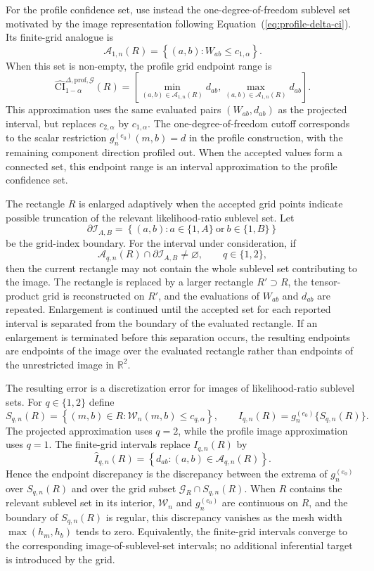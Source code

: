 \documentclass[11pt]{article}
\begin{document}
For the profile confidence set, use instead the one-degree-of-freedom sublevel set motivated by the image representation following Equation~(\ref{eq:profile-delta-ci}). Its finite-grid analogue is
\[
  \mathcal{A}_{1,n}(R)
  =
  \left\{
    (a,b):
    W_{ab}\leq c_{1,\alpha}
  \right\}.
\]
When this set is non-empty, the profile grid endpoint range is
\[
  \widehat{\mathrm{CI}}^{\Delta,\mathrm{prof},\mathcal{G}}_{1-\alpha}(R)
  =
  \left[
    \min_{(a,b)\in\mathcal{A}_{1,n}(R)} d_{ab},
    \max_{(a,b)\in\mathcal{A}_{1,n}(R)} d_{ab}
  \right].
\]
This approximation uses the same evaluated pairs $(W_{ab},d_{ab})$ as the projected interval, but replaces $c_{2,\alpha}$ by $c_{1,\alpha}$. The one-degree-of-freedom cutoff corresponds to the scalar restriction $g_n^{(e_0)}(m,b)=d$ in the profile construction, with the remaining component direction profiled out. When the accepted values form a connected set, this endpoint range is an interval approximation to the profile confidence set.

The rectangle $R$ is enlarged adaptively when the accepted grid points indicate possible truncation of the relevant likelihood-ratio sublevel set. Let
\[
  \partial\mathcal{I}_{A,B}
  =
  \left\{
    (a,b):
    a\in\{1,A\}\ \text{or}\ b\in\{1,B\}
  \right\}
\]
be the grid-index boundary. For the interval under consideration, if
\[
  \mathcal{A}_{q,n}(R)\cap\partial\mathcal{I}_{A,B}\neq\varnothing,
  \qquad q\in\{1,2\},
\]
then the current rectangle may not contain the whole sublevel set contributing to the image. The rectangle is replaced by a larger rectangle $R'\supset R$, the tensor-product grid is reconstructed on $R'$, and the evaluations of $W_{ab}$ and $d_{ab}$ are repeated. Enlargement is continued until the accepted set for each reported interval is separated from the boundary of the evaluated rectangle. If an enlargement is terminated before this separation occurs, the resulting endpoints are endpoints of the image over the evaluated rectangle rather than endpoints of the unrestricted image in $\mathbb{R}^2$.

The resulting error is a discretization error for images of likelihood-ratio sublevel sets. For $q\in\{1,2\}$ define
\[
  S_{q,n}(R)
  =
  \left\{
    (m,b)\in R:
    \mathcal{W}_n(m,b)\leq c_{q,\alpha}
  \right\},
  \qquad
  I_{q,n}(R)=g_n^{(e_0)}\{S_{q,n}(R)\}.
\]
The projected approximation uses $q=2$, while the profile image approximation uses $q=1$. The finite-grid intervals replace $I_{q,n}(R)$ by
\[
  \widehat{I}_{q,n}(R)
  =
  \left\{
    d_{ab}:
    (a,b)\in\mathcal{A}_{q,n}(R)
  \right\}.
\]
Hence the endpoint discrepancy is the discrepancy between the extrema of $g_n^{(e_0)}$ over $S_{q,n}(R)$ and over the grid subset $\mathcal{G}_R\cap S_{q,n}(R)$. When $R$ contains the relevant sublevel set in its interior, $\mathcal{W}_n$ and $g_n^{(e_0)}$ are continuous on $R$, and the boundary of $S_{q,n}(R)$ is regular, this discrepancy vanishes as the mesh width $\max(h_m,h_b)$ tends to zero. Equivalently, the finite-grid intervals converge to the corresponding image-of-sublevel-set intervals; no additional inferential target is introduced by the grid.
\clearpage


\end{document}
